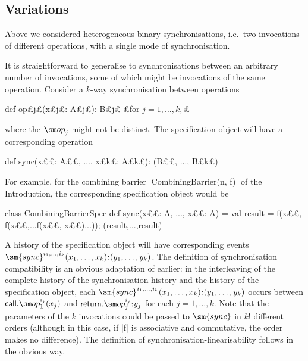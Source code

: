 \subsection{Variations}
\label{ssec:spec-variations}

Above we considered heterogeneous binary synchronisations, i.e.~two
invocations of different operations, with a single mode of synchronisation.

It is straightforward to generalise to synchronisations between an arbitrary
number of invocations, some of which might be invocations of the same
operation.  Consider a $k$-way synchronisation between operations
\begin{scala}
def op£\s j£(x£\s j£: A£\s j£): B£\s j£   £for $j = 1, \ldots, k,$£
\end{scala}
%
where the $\op_j$ might not be distinct.
The specification object will have a corresponding operation
%
\begin{scala} 
def sync(x££: A££, ..., x£\s k£: A£\s k£): (B££, ..., B£\s k£)
\end{scala}
%
For example, for the combining barrier |CombiningBarrier(n, f)| of the
Introduction, the corresponding specification object would be
\begin{scala}
class CombiningBarrierSpec{
  def sync(x££: A, ..., x££: A) = {
    val result = f(x££, f(x££,...f(x££, x££)...)); (result,...,result)
  }
}
\end{scala}

A history of the specification object will have corresponding events
$\sm{sync}^{i_1, \ldots, i_k}(x_1, \ldots, x_k)\:: (y_1, \ldots, y_k)$.
%
The definition of synchronisation compatibility is an obvious adaptation of
earlier: in the interleaving of the complete history of the synchronisation
history and the history of the specification object, each $\sm{sync}^{i_1,
  \ldots, i_k}(x_1, \ldots, x_k)\:: (y_1, \ldots, y_k)$ occurs between
$\call.\op_1^{i_j}(x_j)$ and $\return.\op_j^{i_j}\::y_j$ for each $j = 1,
\ldots, k$.  Note that the parameters of the $k$ invocations could be passed
to $\sm{sync}$ in $k!$ different orders (although in this case, if |f| is
associative and commutative, the order makes no difference). 
The definition of synchronisation-linearisability follows in the obvious
way. 

